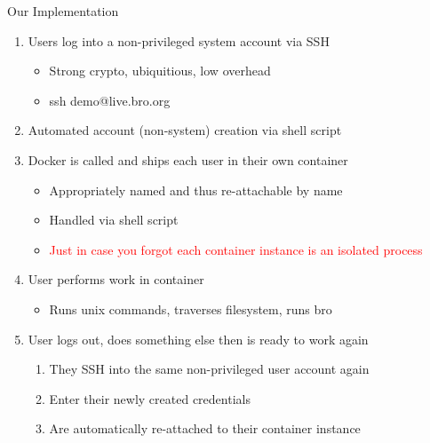 \documentclass[xcolor=svgnames,handout]{beamer}
\begin{document}
\begin{frame}{Our Implementation}
  \begin{enumerate}
    \item Users log into a non-privileged system account via SSH
  	\begin{itemize}
		\item Strong crypto, ubiquitious, low overhead
		\item ssh demo@live.bro.org
	\end{itemize}
    \item Automated account (non-system) creation via shell script
    \item Docker is called and ships each user in their own container
  	\begin{itemize}
		\item Appropriately named and thus re-attachable by name
		\item Handled via shell script
		\item \textcolor{red}{Just in case you forgot each container instance is an isolated process}
	\end{itemize}
    \item User performs work in container
  	\begin{itemize}
		\item Runs unix commands, traverses filesystem, runs bro
	\end{itemize}
    \item User logs out, does something else then is ready to work again
  	\begin{enumerate}
		\item They SSH into the same non-privileged user account again
	 	\item Enter their newly created credentials
	 	\item Are automatically re-attached to their container instance
	\end{enumerate}
  \end{enumerate}
\end{frame}
\end{document}
